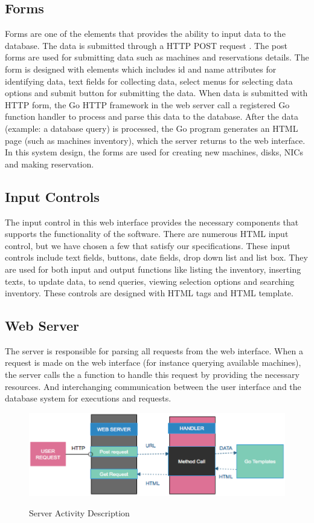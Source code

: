 \subsection*{Forms}
Forms are one  of the elements that provides the ability to input data to the database. The data is submitted through a HTTP POST request \cite{WinNT}. The post forms are used for submitting data such as machines and reservations details. The form is designed with elements which includes id and name attributes for identifying data, text fields for collecting data, select menus for selecting data options and submit button for submitting the data. When data is submitted with HTTP form, the Go HTTP framework in the web server call a registered Go function handler to process and parse this data to the database.  After the data (example: a database query) is processed, the Go program generates an HTML page (such as machines inventory), which the server returns to the web interface. In this system design, the forms are used for creating new machines, disks, NICs and making reservation. 
\subsection*{Input Controls}
The input control in this web interface provides the necessary components that supports the functionality of the software. There are numerous HTML input control, but we have chosen a few that satisfy our specifications. These input controls include text fields, buttons, date fields, drop down list and list box. They are used for both input and output functions like listing the inventory, inserting texts, to update data, to send queries, viewing selection options and searching inventory. These controls are designed with HTML tags and HTML template.
\subsection{Web Server}
The server is responsible for parsing all requests from the web interface. When a request is made on the web interface (for instance querying available machines), the server calls the a function to handle this request by providing the necessary resources. And interchanging communication between the user interface and the database system for executions and requests. 
\begin{figure}[h!]
\includegraphics[width = \linewidth]{server1.eps}
\label{fig:Description of Server Activity} 
\caption{Server Activity Description}
\end{figure}

